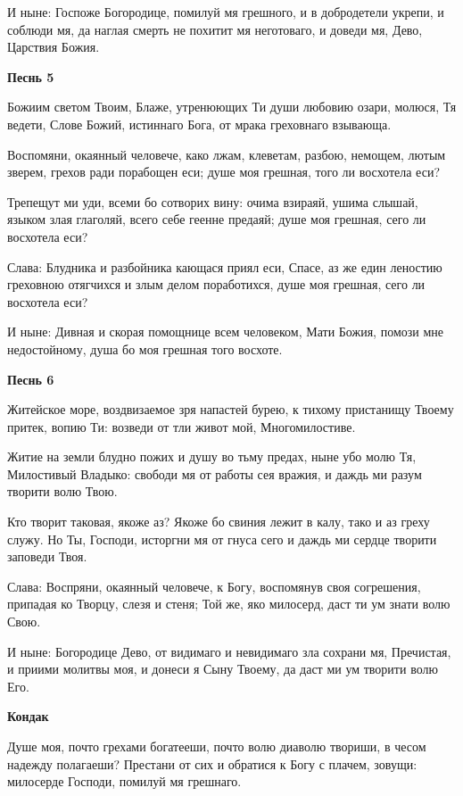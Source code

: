 И ныне: Госпоже Богородице, помилуй мя грешного, и в добродетели укрепи, и соблюди мя, да наглая смерть не похитит мя неготоваго, и доведи мя, Дево, Царствия Божия.


\medskip
\bfseries Песнь 5\normalfont{}\nopagebreak


Божиим светом Твоим, Блаже, утренюющих Ти души любовию озари, молюся, Тя ведети, Слове Божий, истиннаго Бога, от мрака греховнаго взывающа.


Воспомяни, окаянный человече, како лжам, клеветам, разбою, немощем, лютым зверем, грехов ради порабощен еси; душе моя грешная, того ли восхотела еси?


Трепещут ми уди, всеми бо сотворих вину: очима взираяй, ушима слышай, языком злая глаголяй, всего себе геенне предаяй; душе моя грешная, сего ли восхотела еси?


Слава: Блудника и разбойника кающася приял еси, Спасе, аз же един леностию греховною отягчихся и злым делом поработихся, душе моя грешная, сего ли восхотела еси?


И ныне: Дивная и скорая помощнице всем человеком, Мати Божия, помози мне недостойному, душа бо моя грешная того восхоте.


\medskip
\bfseries Песнь 6\normalfont{}\nopagebreak


Житейское море, воздвизаемое зря напастей бурею, к тихому пристанищу Твоему притек, вопию Ти: возведи от тли живот мой, Многомилостиве.


Житие на земли блудно пожих и душу во тьму предах, ныне убо молю Тя, Милостивый Владыко: свободи мя от работы сея вражия, и даждь ми разум творити волю Твою.


Кто творит таковая, якоже аз? Якоже бо свиния лежит в калу, тако и аз греху служу. Но Ты, Господи, исторгни мя от гнуса сего и даждь ми сердце творити заповеди Твоя.


Слава: Воспряни, окаянный человече, к Богу, воспомянув своя согрешения, припадая ко Творцу, слезя и стеня; Той же, яко милосерд, даст ти ум знати волю Свою.


И ныне: Богородице Дево, от видимаго и невидимаго зла сохрани мя, Пречистая, и приими молитвы моя, и донеси я Сыну Твоему, да даст ми ум творити волю Его.


\medskip
\bfseries Кондак\normalfont{}\nopagebreak


Душе моя, почто грехами богатееши, почто волю диаволю твориши, в чесом надежду полагаеши? Престани от сих и обратися к Богу с плачем, зовущи: милосерде Господи, помилуй мя грешнаго.


